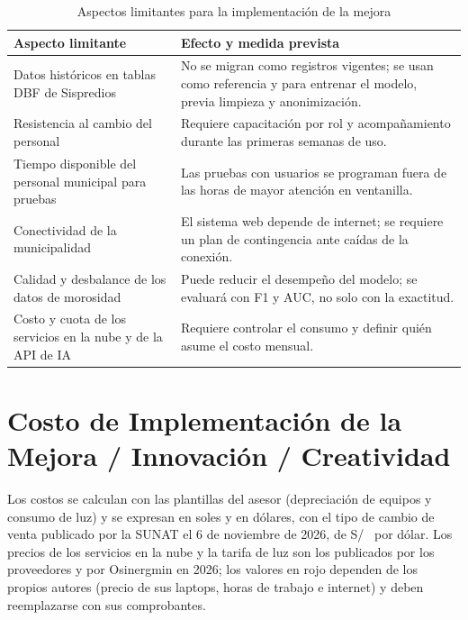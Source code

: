 \documentclass[12pt,a4paper]{report}
\newcommand{\nota}[1]{\par\vspace{1pt}{\singlespacing\footnotesize\raggedright\textit{Nota.} #1\par}}
\newcommand{\supuesto}[1]{\textcolor{pendcol}{#1}}
\newcommand{\soles}[1]{\edef\tmpval{\fpeval{round(#1,2)}}S/~\pgfmathprintnumber{\tmpval}}
\begin{document}
\begin{table}[H]
\centering
\caption{Aspectos limitantes para la implementación de la mejora}
\label{tab:limitantes}
\singlespacing\small
\begin{tabular}{@{}L{5.6cm}L{8.8cm}@{}}
\toprule
\textbf{Aspecto limitante} & \textbf{Efecto y medida prevista} \\
\midrule
Datos históricos en tablas DBF de Sispredios & No se migran como registros vigentes; se usan como referencia y para entrenar el modelo, previa limpieza y anonimización. \\
Resistencia al cambio del personal & Requiere capacitación por rol y acompañamiento durante las primeras semanas de uso. \\
Tiempo disponible del personal municipal para pruebas & Las pruebas con usuarios se programan fuera de las horas de mayor atención en ventanilla. \\
Conectividad de la municipalidad & El sistema web depende de internet; se requiere un plan de contingencia ante caídas de la conexión. \\
Calidad y desbalance de los datos de morosidad & Puede reducir el desempeño del modelo; se evaluará con F1 y AUC, no solo con la exactitud. \\
Costo y cuota de los servicios en la nube y de la API de IA & Requiere controlar el consumo y definir quién asume el costo mensual. \\
\bottomrule
\end{tabular}
\nota{Elaboración propia.}
\end{table}

\chapter{Costo de Implementación de la Mejora / Innovación / Creatividad}

Los costos se calculan con las plantillas del asesor (depreciación de equipos y consumo de luz) y se expresan en soles y en dólares, con el tipo de cambio de venta publicado por la SUNAT el 6 de noviembre de 2026, de \soles{\TC} por dólar. Los precios de los servicios en la nube y la tarifa de luz son los publicados por los proveedores y por Osinergmin en 2026; los valores en \supuesto{rojo} dependen de los propios autores (precio de sus laptops, horas de trabajo e internet) y deben reemplazarse con sus comprobantes.
\end{document}
